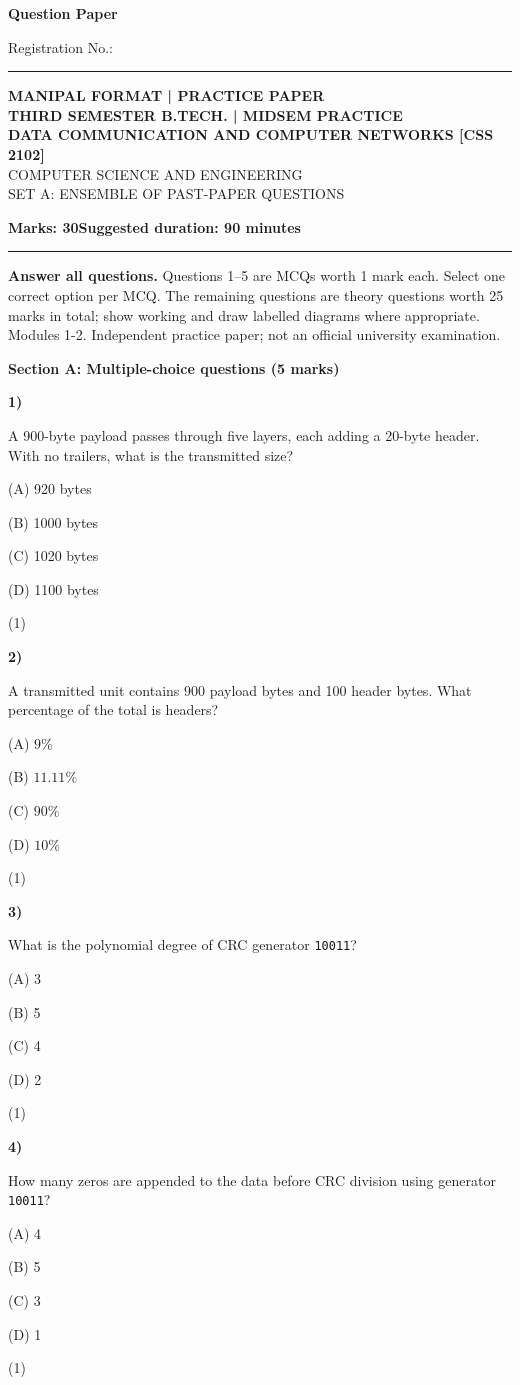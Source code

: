 \documentclass[10pt,a4paper]{article}
\newcommand{\question}[3]{\par\vspace{6pt}\noindent\begin{minipage}[t]{0.075\linewidth}\textbf{#1)}\end{minipage}\begin{minipage}[t]{0.855\linewidth}#3\end{minipage}\hfill\begin{minipage}[t]{0.055\linewidth}\raggedleft(#2)\end{minipage}\par}
\begin{document}
{\LARGE\bfseries Question Paper}\hfill {\small Registration No.: \rule{33mm}{0.3pt}}\par\vspace{8pt}
\begin{center}{\large\bfseries MANIPAL FORMAT | PRACTICE PAPER}\\[6pt]{\bfseries THIRD SEMESTER B.TECH. | MIDSEM PRACTICE}\\[4pt]{\bfseries DATA COMMUNICATION AND COMPUTER NETWORKS [CSS 2102]}\\[4pt]{\small COMPUTER SCIENCE AND ENGINEERING}\\[3pt]{\small SET A: ENSEMBLE OF PAST-PAPER QUESTIONS}\end{center}
\textbf{Marks: 30}\hfill\textbf{Suggested duration: 90 minutes}\par\vspace{3pt}\hrule\vspace{5pt}
{\small\textbf{Answer all questions.} Questions 1--5 are MCQs worth 1 mark each. Select one correct option per MCQ. The remaining questions are theory questions worth 25 marks in total; show working and draw labelled diagrams where appropriate. Modules 1-2. Independent practice paper; not an official university examination.}\par
\medskip\textbf{Section A: Multiple-choice questions (5 marks)}\par
\question{1}{1}{A 900-byte payload passes through five layers, each adding a 20-byte header. With no trailers, what is the transmitted size?\par (A) 920 bytes\par (B) 1000 bytes\par (C) 1020 bytes\par (D) 1100 bytes}
\question{2}{1}{A transmitted unit contains 900 payload bytes and 100 header bytes. What percentage of the total is headers?\par (A) $9\%$\par (B) $11.11\%$\par (C) $90\%$\par (D) $10\%$}
\question{3}{1}{What is the polynomial degree of CRC generator \texttt{10011}?\par (A) 3\par (B) 5\par (C) 4\par (D) 2}
\question{4}{1}{How many zeros are appended to the data before CRC division using generator \texttt{10011}?\par (A) 4\par (B) 5\par (C) 3\par (D) 1}
\end{document}
